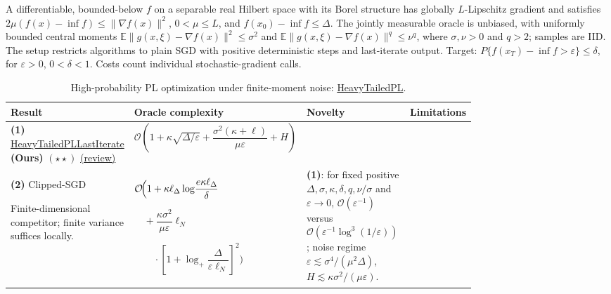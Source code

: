 \begin{table}[tp]
\centering
\caption{High-probability PL optimization under finite-moment noise: \href{https://github.com/k3nfalt/longtails/blob/main/LongTails/Setups/HeavyTailedPL.lean}{HeavyTailedPL}.}\label{tab:HeavyTailedPL}
\parbox{\linewidth}{\footnotesize A differentiable, bounded-below $f$ on a separable real Hilbert space with its Borel structure has globally $L$-Lipschitz gradient and satisfies $2\mu(f(x)-\inf f)\leq\|\nabla f(x)\|^2$, $0<\mu\leq L$, and $f(x_0)-\inf f\leq\Delta$. The jointly measurable oracle is unbiased, with uniformly bounded central moments $\mathbb E\|g(x,\xi)-\nabla f(x)\|^2\leq\sigma^2$ and $\mathbb E\|g(x,\xi)-\nabla f(x)\|^q\leq\nu^q$, where $\sigma,\nu>0$ and $q>2$; samples are IID. The setup restricts algorithms to plain SGD with positive deterministic steps and last-iterate output. Target: $P\{f(x_T)-\inf f>\varepsilon\}\leq\delta$, for $\varepsilon>0$, $0<\delta<1$. Costs count individual stochastic-gradient calls.}\par\smallskip
\begin{threeparttable}
\footnotesize
\setlength{\tabcolsep}{4pt}\renewcommand{\arraystretch}{1.25}
\begin{tabularx}{\linewidth}{@{}>{\raggedright\arraybackslash}p{0.20\linewidth}>{\raggedright\arraybackslash}p{0.32\linewidth}>{\raggedright\arraybackslash}p{0.25\linewidth}>{\raggedright\arraybackslash}X@{}}
\toprule
\textbf{Result} & \textbf{Oracle complexity} & \textbf{Novelty} & \textbf{Limitations} \\
\midrule
\textbf{(1)} \href{https://github.com/k3nfalt/longtails/blob/main/LongTails/Theorems/HeavyTailedPLLastIterate.lean}{Heavy\allowbreak Tailed\allowbreak PL\allowbreak Last\allowbreak Iterate} \textbf{(Ours)} $(\star\star)$ \href{https://github.com/k3nfalt/longtails/blob/main/scripts/reviews/HeavyTailedPLLastIterate.md}{(review)}
& $\mathcal{O}\!\left(1+\kappa\sqrt{\Delta/\varepsilon}+\dfrac{\sigma^2(\kappa+\ell)}{\mu\varepsilon}+H\right)$
& & \\
\midrule[1.2pt]
\textbf{(2)} Clipped-SGD \citep[Thm.~E.4, $\alpha=2$]{htplSadiev2023v2}
\par Finite-dimensional competitor; finite variance suffices locally.
& $\mathcal{O}\!\Bigl(1+\kappa\ell_\Delta\log\!\dfrac{e\kappa\ell_\Delta}{\delta}$\par
$\quad+\dfrac{\kappa\sigma^2}{\mu\varepsilon}\ell_N$\par
$\qquad\cdot[1+\log_+\!\dfrac{\Delta}{\varepsilon\ell_N}]^2\Bigr)$
& \textbf{(1)}: for fixed positive $\Delta,\sigma,\kappa,\delta,q,\nu/\sigma$ and $\varepsilon\to0$, $\mathcal{O}(\varepsilon^{-1})$ versus $\mathcal{O}(\varepsilon^{-1}\log^3(1/\varepsilon))$; noise regime $\varepsilon\lesssim\sigma^4/(\mu^2\Delta)$, $H\lesssim\kappa\sigma^2/(\mu\varepsilon)$.

\end{tabularx}
\end{threeparttable}
\end{table}
